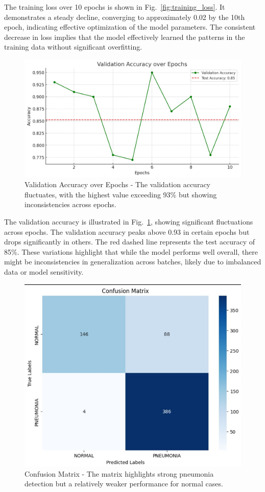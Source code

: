 \documentclass[
  twocolumn,
  10pt,
  a4paper,
  journal
]{IEEEtran}
\begin{document}
The training loss over 10 epochs is shown in Fig.~\ref{fig:training_loss}. It demonstrates a steady decline, converging to approximately 0.02 by the 10th epoch, indicating effective optimization of the model parameters. The consistent decrease in loss implies that the model effectively learned the patterns in the training data without significant overfitting.

\begin{figure}[!t]
\centering
\includegraphics[width=\columnwidth]{figures/figure5.jpeg}
\caption{Validation Accuracy over Epochs - The validation accuracy fluctuates, with the highest value exceeding 93\% but showing inconsistencies across epochs.}
\label{fig:validation_accuracy}
\end{figure}

The validation accuracy is illustrated in Fig.~\ref{fig:validation_accuracy}, showing significant fluctuations across epochs. The validation accuracy peaks above 0.93 in certain epochs but drops significantly in others. The red dashed line represents the test accuracy of 85\%. These variations highlight that while the model performs well overall, there might be inconsistencies in generalization across batches, likely due to imbalanced data or model sensitivity.

\begin{figure}[!t]
\centering
\includegraphics[width=0.9\columnwidth]{figures/figure6.jpeg}
\caption{Confusion Matrix - The matrix highlights strong pneumonia detection but a relatively weaker performance for normal cases.}
\label{fig:confusion_matrix}
\end{figure}
\end{document}
